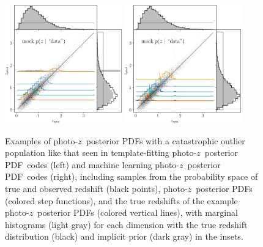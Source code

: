 \documentclass[iop]{emulateapj}
\newcommand{\todo}[3]{{\color{#2}\emph{#1}: #3}}
\newcommand{\aim}[1]{\todo{AIM}{red}{#1}}
\newcommand{\pz}{photo-$z$}
\newcommand{\pzpdf}{\pz\ posterior PDF}%
\begin{document}
\begin{figure}
	\begin{center}
	\includegraphics[width=0.45\textwidth]{figures/chippr/thesis_eout-mega_scatter.png}
	\includegraphics[width=0.45\textwidth]{figures/chippr/thesis_rout-mega_scatter.png}
	\caption{
		Examples of \pzpdf s with a catastrophic outlier population like that seen in template-fitting \pzpdf\ codes (left) and machine learning \pzpdf\ codes (right), including samples from the probability space of true and observed redshift (black points), \pzpdf s (colored step functions), and the true redshifts of the example \pzpdf s (colored vertical lines), with marginal histograms (light gray) for each dimension with the true redshift distribution (black) and implicit prior (dark gray) in the insets.
	}
	\label{fig:nonuniform-outliers-data}
	\end{center}
\end{figure}
\end{document}
